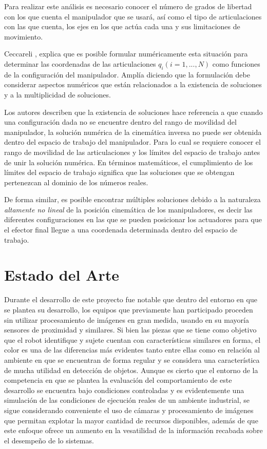 Para realizar este análisis es necesario conocer el número de grados de libertad con los que cuenta el manipulador que se usará, así como el tipo de articulaciones con las que cuenta, los ejes en los que actúa cada una y sus limitaciones de movimiento.

Ceccareli \cite{ceccarelli_fundamentals_2022}, explica que es posible formular numéricamente esta situación para determinar las coordenadas de las articulaciones $q_{i}(i=1,...,N)$ como funciones de la configuración del manipulador. Amplía diciendo que la formulación debe considerar aspectos numéricos que están relacionados a la existencia de soluciones  y a la multiplicidad de soluciones.

Los autores describen que la existencia de soluciones hace referencia a que cuando una configuración dada no se encuentre dentro del rango de movilidad del manipulador, la solución numérica de la cinemática inversa no puede ser obtenida dentro del espacio de trabajo del manipulador. Para lo cual se requiere conocer el rango de movilidad de las articulaciones y los límites del espacio de trabajo antes de unir la solución numérica. En términos matemáticos, el cumplimiento de los límites del espacio de trabajo significa que las soluciones que se obtengan pertenezcan al dominio de los números reales.

De forma similar, es posible encontrar múltiples soluciones  debido a la naturaleza \textit{altamente no lineal} de la posición cinemática de los manipuladores, es decir las diferentes configuraciones en las que se pueden posicionar los actuadores para que el efector final llegue a una coordenada determinada dentro del espacio de trabajo. 

\section{Estado del Arte}

Durante el desarrollo de este proyecto fue notable que dentro del entorno en que se plantea su desarrollo, los equipos que previamente han participado proceden sin utilizar procesamiento de imágenes en gran medida, usando en su mayoría sensores de proximidad y similares. Si bien las piezas que se tiene como objetivo que el robot identifique y sujete cuentan con características similares en forma, el color es una de las diferencias más evidentes tanto entre ellas como en relación al ambiente en que se encuentran de forma regular y se considera una característica de mucha utilidad en detección de objetos. Aunque es cierto que el entorno de la competencia en que se plantea la evaluación del comportamiento de este desarrollo se encuentra bajo condiciones controladas y es evidentemente una simulación de las condiciones de ejecución reales de un ambiente industrial, se sigue considerando conveniente el uso de cámaras y procesamiento de imágenes que permitan explotar la mayor cantidad de recursos disponibles, además de que este enfoque ofrece un aumento en la vesatilidad de la información recabada sobre el desempeño de lo sistemas.

